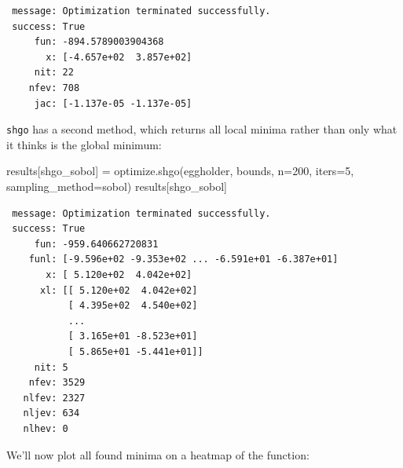 \documentclass[
  letterpaper,
  DIV=11,
  numbers=noendperiod]{scrreprt}
\newenvironment{Shaded}{\begin{snugshade}}{\end{snugshade}}
\newcommand{\DecValTok}[1]{\textcolor[rgb]{0.68,0.00,0.00}{#1}}
\newcommand{\NormalTok}[1]{\textcolor[rgb]{0.00,0.23,0.31}{#1}}
\newcommand{\OperatorTok}[1]{\textcolor[rgb]{0.37,0.37,0.37}{#1}}
\newcommand{\StringTok}[1]{\textcolor[rgb]{0.13,0.47,0.30}{#1}}
\begin{document}
\begin{verbatim}
 message: Optimization terminated successfully.
 success: True
     fun: -894.5789003904368
       x: [-4.657e+02  3.857e+02]
     nit: 22
    nfev: 708
     jac: [-1.137e-05 -1.137e-05]
\end{verbatim}

\texttt{shgo} has a second method, which returns all local minima rather
than only what it thinks is the global minimum:

\begin{Shaded}
\begin{Highlighting}[]
\NormalTok{results[}\StringTok{\textquotesingle{}shgo\_sobol\textquotesingle{}}\NormalTok{] }\OperatorTok{=}\NormalTok{ optimize.shgo(eggholder, bounds, n}\OperatorTok{=}\DecValTok{200}\NormalTok{, iters}\OperatorTok{=}\DecValTok{5}\NormalTok{,}
\NormalTok{                                      sampling\_method}\OperatorTok{=}\StringTok{\textquotesingle{}sobol\textquotesingle{}}\NormalTok{)}
\NormalTok{results[}\StringTok{\textquotesingle{}shgo\_sobol\textquotesingle{}}\NormalTok{]}
\end{Highlighting}
\end{Shaded}

\begin{verbatim}
 message: Optimization terminated successfully.
 success: True
     fun: -959.640662720831
    funl: [-9.596e+02 -9.353e+02 ... -6.591e+01 -6.387e+01]
       x: [ 5.120e+02  4.042e+02]
      xl: [[ 5.120e+02  4.042e+02]
           [ 4.395e+02  4.540e+02]
           ...
           [ 3.165e+01 -8.523e+01]
           [ 5.865e+01 -5.441e+01]]
     nit: 5
    nfev: 3529
   nlfev: 2327
   nljev: 634
   nlhev: 0
\end{verbatim}

We'll now plot all found minima on a heatmap of the function:
\end{document}
